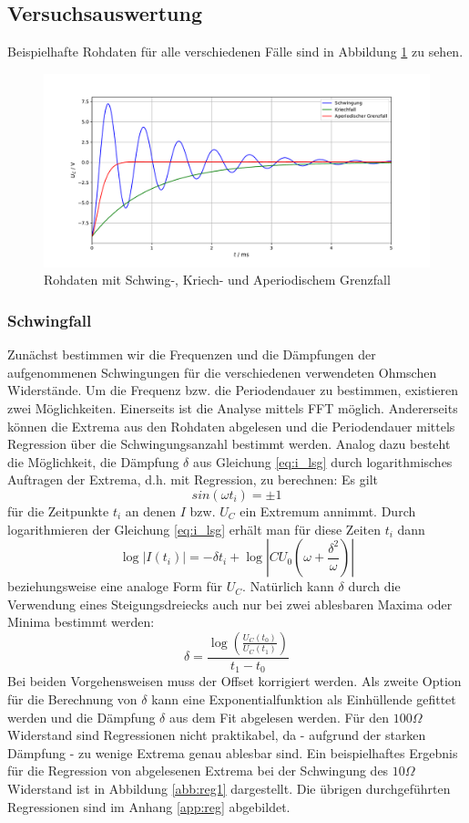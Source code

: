 \documentclass[a4paper, 12pt]{scrartcl}
\begin{document}
\subsection{Versuchsauswertung}

Beispielhafte Rohdaten für alle verschiedenen Fälle sind in Abbildung \ref{abb:rohdaten_ska} zu sehen.

\begin{figure}[H]
\centering
\includegraphics[width=\textwidth]{plots/rohdaten_ska.pdf}
\caption{Rohdaten mit Schwing-, Kriech- und Aperiodischem Grenzfall}
\label{abb:rohdaten_ska}
\end{figure}

\subsubsection{Schwingfall}
Zunächst bestimmen wir die Frequenzen und die Dämpfungen der aufgenommenen Schwingungen für die verschiedenen verwendeten Ohmschen Widerstände. Um die Frequenz bzw. die Periodendauer zu bestimmen, existieren zwei Möglichkeiten. Einerseits ist die Analyse mittels FFT möglich. Andererseits können die Extrema aus den Rohdaten abgelesen und die Periodendauer mittels Regression über die Schwingungsanzahl bestimmt werden.
Analog dazu besteht die Möglichkeit, die Dämpfung $\delta$ aus Gleichung \ref{eq:i_lsg} durch logarithmisches Auftragen der Extrema, d.h. mit Regression, zu berechnen: Es gilt
$$sin(\omega t_i) = \pm 1$$
für die Zeitpunkte $t_i$ an denen $I$ bzw. $U_C$ ein Extremum annimmt. Durch logarithmieren der Gleichung \ref{eq:i_lsg} erhält man für diese Zeiten $t_i$ dann
$$\log \lvert I(t_i)\rvert = -\delta t_i + \log\left\lvert CU_0 \left(\omega+\frac{\delta^2}{\omega}\right)\right\rvert$$
beziehungsweise eine analoge Form für $U_C$. Natürlich kann $\delta$ durch die Verwendung eines Steigungsdreiecks auch nur bei zwei ablesbaren Maxima oder Minima bestimmt werden:
$$\delta = \frac{\log\left(\frac{U_C(t_0)}{U_C(t_1)}\right)}{t_1-t_0}$$
Bei beiden Vorgehensweisen muss der Offset korrigiert werden. Als zweite Option für die Berechnung von $\delta$ kann eine Exponentialfunktion als Einhüllende gefittet werden und die Dämpfung $\delta$ aus dem Fit abgelesen werden.
Für den $100\Omega$ Widerstand sind Regressionen nicht praktikabel, da - aufgrund der starken Dämpfung - zu wenige Extrema genau ablesbar sind. Ein beispielhaftes Ergebnis für die Regression von abgelesenen Extrema bei der Schwingung des $10\Omega$ Widerstand ist in Abbildung \ref{abb:reg1} dargestellt. Die übrigen durchgeführten Regressionen sind im Anhang \ref{app:reg} abgebildet.
\end{document}
